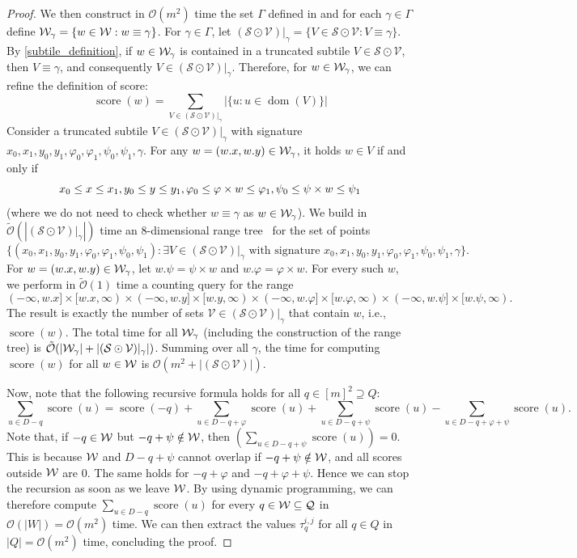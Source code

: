 \documentclass[11pt, letterpaper]{article}
\theoremstyle{plain}
\theoremstyle{definition}
\theoremstyle{remark}
\renewcommand{\O}{\mathcal{O}}
\newcommand{\tO}{\tilde{\mathcal{O}}}
\newcommand{\Q}{\mathcal{Q}}
\renewcommand{\S}{\mathcal{S}}
\newcommand{\V}{\mathcal{V}}
\renewcommand{\phi}{\varphi}
\DeclareMathOperator*{\score}{score}
\DeclareMathOperator*{\dom}{dom}
\newcommand{\absolute}[1]{\left\lvert#1\right\rvert}
\begin{document}
\begin{proof}
We then construct in $\O(m^2)$ time the set $\Gamma$ defined in  and for each $\gamma \in \Gamma$ define $\mathcal{W}_\gamma = \{w \in \mathcal{W} : w \equiv \gamma\}$. For $\gamma \in \Gamma$, let $(\S \odot \V) |_\gamma = \{V \in \S \odot \V : V \equiv \gamma\}$. 
By \cref{subtile_definition}, if $w \in \mathcal{W}_\gamma$ is contained in a truncated subtile $V \in \S \odot \V$, then $V \equiv \gamma$, and consequently $V \in (\S \odot \V) |_\gamma$. Therefore, for $w \in \mathcal{W}_\gamma$, we can refine the definition of score:
%
$$\score(w) = \sum_{V \in (\S \odot \V) |_\gamma} \absolute{\{u : u \in \dom(V)\}}$$
%
Consider a truncated subtile $V \in (\S \odot \V) |_\gamma$ with signature $x_0, x_1, y_0, y_1, \phi_0, \phi_1, \psi_0, \psi_1, \gamma$. For any $w = (w.x, w.y) \in \mathcal{W}_\gamma$, it holds $w \in V$ if and only if
\begin{equation}
\label{eq:range}
x_0 \le x \le x_1, y_0 \le y \le y_1, \phi_0 \le \h{w} \le \phi_1, \psi_0 \le \s{w} \le \psi_1
\end{equation}
(where we do not need to check whether $w \equiv \gamma$ as $w \in \mathcal{W}_\gamma$). We build in $\tO(\absolute{(\S \odot \V) |_\gamma})$ time an $8$-dimensional range tree~\cite{BENTLEY1979244} for the set of points 
%
$$\{(x_0, x_1, y_0, y_1, \phi_0, \phi_1, \psi_0, \psi_1) : \exists V \in (\S \odot \V) |_\gamma\text{\ with signature\ } x_0, x_1, y_0, y_1, \phi_0, \phi_1, \psi_0, \psi_1, \gamma\}.$$
For $w = (w.x, w.y) \in \mathcal{W}_\gamma$, let $w.\psi = \psi \times w$ and $w.\phi = \phi \times w$. For every such $w$, we perform in $\tO(1)$ time a counting query for the range 
$$
(-\infty, w.x] \times [w.x, \infty) \times 
(-\infty, w.y] \times [w.y, \infty) \times
(-\infty, w.\phi] \times [w.\phi, \infty) \times
(-\infty, w.\psi] \times [w.\psi, \infty).
$$
The result is exactly the number of sets $\V \in (\S \odot \V) |_\gamma$ that contain $w$, i.e., $\score(w)$. The total time for all $\mathcal{W}_\gamma$ (including the construction of the range tree) is $\tO(\absolute{\W_\gamma} + \absolute{(\S \odot \V) |_\gamma})$. Summing over all $\gamma$, the time for computing $\score(w)$ for all $w \in \mathcal{W}$ is $\O(m^2 + \absolute{(\S \odot \V)})$.

Now, note that the following recursive formula holds for all $q \in [m]^2 \supseteq Q$:
%
$$\sum_{u \in D-q} \score(u) = \score(-q) + \sum_{u \in D-q+\phi} \score(u) + \sum_{u \in D-q+\psi} \score(u) -\sum_{u \in D-q+\phi+\psi} \score(u).$$
%
Note that, if $-q \in \mathcal{W}$ but $-q + \psi \notin \mathcal{W}$, then $(\sum_{u \in D-q+\psi} \score(u)) = 0$. This is because $\mathcal{W}$ and $D -q + \psi$ cannot overlap if $-q + \psi \notin \mathcal{W}$, and all scores outside $\mathcal{W}$ are $0$. The same holds for $-q + \phi$ and $-q + \phi + \psi$. Hence we can stop the recursion as soon as we leave $\mathcal{W}$. By using dynamic programming, we can therefore compute $\sum_{u \in D-q} \score(u)$ for every $q \in\W \subseteq \Q$ in $\O(\absolute{W}) = \O(m^2)$ time. 
We can then extract the values $\tau^{i,j}_q$ for all $q \in Q$ in $\absolute{Q} = \O(m^2)$ time, concluding the proof. 
\end{proof}
	
\end{document}
